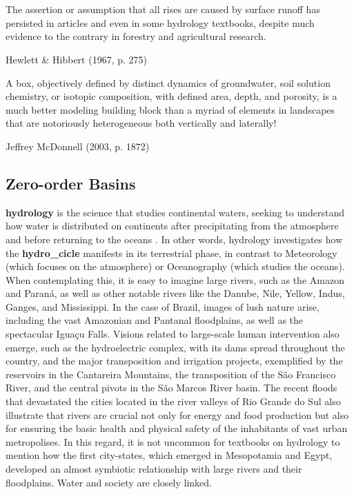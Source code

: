 \documentclass[./main_en.tex]{subfiles}
\begin{document}
\chapter{\chapHydroEn} \label{chap:hydrology}

\setlength{\parskip}{0mm}

\epigraph{\small{The assertion or assumption that all rises are caused by surface runoff has persisted in articles and even in some hydrology textbooks, despite much evidence to the contrary in forestry and agricultural research.}}{Hewlett \& Hibbert (1967, p. 275) \cite{Hewlett1967}}

\epigraph{\small{A box, objectively defined by distinct dynamics of groundwater, soil solution chemistry, or isotopic composition, with defined area, depth, and porosity, is a much better modeling building block than a myriad of elements in landscapes that are notoriously heterogeneous both vertically and laterally!}}{Jeffrey McDonnell (2003, p. 1872) \cite{Mcdonnell2003a}}

\setlength{\parskip}{\myparskip}

\section{Zero-order Basins} \label{sec:hydro:intro}

\par \textbf{\gls{hydrology}} is the science that studies continental waters, seeking to understand how water is distributed on continents after precipitating from the atmosphere and before returning to the oceans \cite{chow1964}. In other words, \gls{hydrology} investigates how the \textbf{\gls{hydro_cicle}} manifests in its terrestrial phase, in contrast to Meteorology (which focuses on the atmosphere) or Oceanography (which studies the oceans). When contemplating this, it is easy to imagine large rivers, such as the Amazon and Paraná, as well as other notable rivers like the Danube, Nile, Yellow, Indus, Ganges, and Mississippi. In the case of Brazil, images of lush nature arise, including the vast Amazonian and Pantanal floodplains, as well as the spectacular Iguaçu Falls. Visions related to large-scale human intervention also emerge, such as the hydroelectric complex, with its dams spread throughout the country, and the major transposition and irrigation projects, exemplified by the reservoirs in the Cantareira Mountains, the transposition of the São Francisco River, and the central pivots in the São Marcos River basin. The recent floods that devastated the cities located in the river valleys of Rio Grande do Sul also illustrate that rivers are crucial not only for energy and food production but also for ensuring the basic health and physical safety of the inhabitants of vast urban metropolises. In this regard, it is not uncommon for textbooks on \gls{hydrology} to mention how the first city-states, which emerged in Mesopotamia and Egypt, developed an almost symbiotic relationship with large rivers and their floodplains. Water and society are closely linked.
\end{document}
